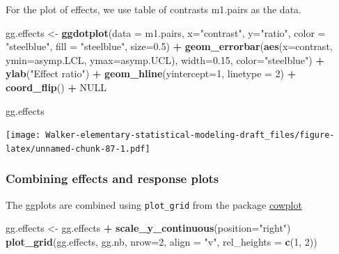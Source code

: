 \documentclass[]{book}
\newenvironment{Shaded}{\begin{snugshade}}{\end{snugshade}}
\newcommand{\DataTypeTok}[1]{\textcolor[rgb]{0.13,0.29,0.53}{#1}}
\newcommand{\DecValTok}[1]{\textcolor[rgb]{0.00,0.00,0.81}{#1}}
\newcommand{\FloatTok}[1]{\textcolor[rgb]{0.00,0.00,0.81}{#1}}
\newcommand{\KeywordTok}[1]{\textcolor[rgb]{0.13,0.29,0.53}{\textbf{#1}}}
\newcommand{\NormalTok}[1]{#1}
\newcommand{\OperatorTok}[1]{\textcolor[rgb]{0.81,0.36,0.00}{\textbf{#1}}}
\newcommand{\OtherTok}[1]{\textcolor[rgb]{0.56,0.35,0.01}{#1}}
\newcommand{\StringTok}[1]{\textcolor[rgb]{0.31,0.60,0.02}{#1}}
\begin{document}
For the plot of effects, we use table of contrasts m1.pairs as the data.

\begin{Shaded}
\begin{Highlighting}[]
\NormalTok{gg.effects <-}\StringTok{ }\KeywordTok{ggdotplot}\NormalTok{(}\DataTypeTok{data =}\NormalTok{ m1.pairs,}
                        \DataTypeTok{x=}\StringTok{"contrast"}\NormalTok{, }
                        \DataTypeTok{y=}\StringTok{"ratio"}\NormalTok{, }
                        \DataTypeTok{color =} \StringTok{"steelblue"}\NormalTok{,}
                        \DataTypeTok{fill =} \StringTok{"steelblue"}\NormalTok{,}
                        \DataTypeTok{size=}\FloatTok{0.5}\NormalTok{) }\OperatorTok{+}
\StringTok{  }
\StringTok{  }\KeywordTok{geom_errorbar}\NormalTok{(}\KeywordTok{aes}\NormalTok{(}\DataTypeTok{x=}\NormalTok{contrast, }
                    \DataTypeTok{ymin=}\NormalTok{asymp.LCL, }
                    \DataTypeTok{ymax=}\NormalTok{asymp.UCL),}
                \DataTypeTok{width=}\FloatTok{0.15}\NormalTok{, }
                \DataTypeTok{color=}\StringTok{"steelblue"}\NormalTok{) }\OperatorTok{+}
\StringTok{  }\KeywordTok{ylab}\NormalTok{(}\StringTok{"Effect ratio"}\NormalTok{) }\OperatorTok{+}
\StringTok{  }\KeywordTok{geom_hline}\NormalTok{(}\DataTypeTok{yintercept=}\DecValTok{1}\NormalTok{, }\DataTypeTok{linetype =} \DecValTok{2}\NormalTok{) }\OperatorTok{+}
\StringTok{  }\KeywordTok{coord_flip}\NormalTok{() }\OperatorTok{+}\StringTok{ }
\StringTok{  }
\StringTok{  }\OtherTok{NULL}

\NormalTok{gg.effects}
\end{Highlighting}
\end{Shaded}

\texttt{[image: Walker-elementary-statistical-modeling-draft\_files/figure-latex/unnamed-chunk-87-1.pdf]}

\hypertarget{combining-effects-and-response-plots}{%
\subsubsection{Combining effects and response plots}\label{combining-effects-and-response-plots}}

The ggplots are combined using \texttt{plot\_grid} from the package \href{https://cran.r-project.org/web/packages/cowplot/vignettes/introduction.html}{cowplot}

\begin{Shaded}
\begin{Highlighting}[]
\NormalTok{gg.effects <-}\StringTok{ }\NormalTok{gg.effects }\OperatorTok{+}\StringTok{ }\KeywordTok{scale_y_continuous}\NormalTok{(}\DataTypeTok{position=}\StringTok{"right"}\NormalTok{)}
\KeywordTok{plot_grid}\NormalTok{(gg.effects, gg.nb, }\DataTypeTok{nrow=}\DecValTok{2}\NormalTok{, }\DataTypeTok{align =} \StringTok{"v"}\NormalTok{, }\DataTypeTok{rel_heights =} \KeywordTok{c}\NormalTok{(}\DecValTok{1}\NormalTok{, }\DecValTok{2}\NormalTok{))}
\end{Highlighting}
\end{Shaded}
\end{document}

